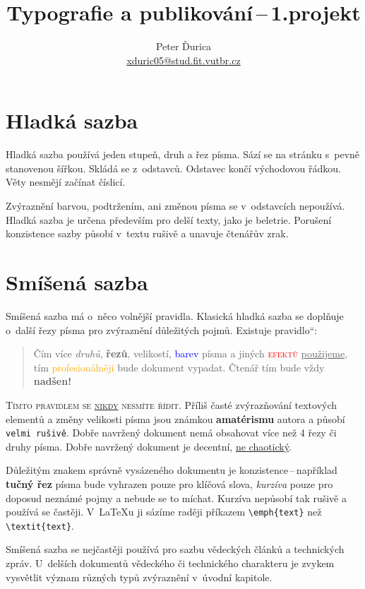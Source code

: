 \documentclass[10pt, a4paper, twocolumn]{article}
\title{Typografie a publikování\,--\,1.projekt}
\author{Peter Ďurica\\\href{mailto:xduric05@stud.fit.vutbr.cz}{xduric05@stud.fit.vutbr.cz}}
\date{\vspace{-5ex}}
\newcommand{\myuv}[1]{\quotedblbase #1\textquotedblleft}
\begin{document}
    \maketitle
    \section{Hladká sazba}

        Hladká sazba používá jeden stupeň, druh a řez písma. Sází se na stránku s~pevně stanovenou šířkou. Skládá se z~od\-stav\-ců. Odstavec končí východovou řádkou. Věty nesmějí začínat číslicí.

        Zvýraznění barvou, podtržením, ani změnou písma se v~odstavcích nepoužívá. Hladká sazba je určena především pro delší texty, jako je beletrie. Porušení konzistence sazby působí v~textu rušivě a unavuje čtenářův zrak.
    \section{Smíšená sazba}
    \label{two}
        Smíšená sazba má o~něco volnější pravidla. Klasická hladká sazba se doplňuje o~další řezy písma pro zvýraznění důle\-žitých pojmů. Existuje \myuv{pravidlo}:
            \begin{quotation}{
                Čím více \emph{druhů}, \textbf{řezů}, \huge velikostí\normalsize,  \textcolor{blue}{barev} písma a jiných \textsc{\textcolor{red}{efektů}} \underline{použijeme}, tím \textcolor{Orange}{pro\-fe\-sio\-nál\-ně\-ji} bude {\selectfont \Large dokument} vypadat. \tiny Čtenář \normalsize tím bude vždy \Huge\textbf{nadšen!}
            }\end{quotation}
        \textsc{Tímto pravidlem se \underline{nikdy} nesmíte řídit.}
        Příliš časté zvýrazňování textových elementů a změny \tiny velikosti \normalsize písma jsou známkou \textbf{amatérismu} autora a působí \texttt{velmi rušivě}.
        Dobře navržený dokument nemá obsahovat více než 4 řezy či druhy písma.
        Dobře navržený dokument je decentní, \underline{ne chaotický}.

        Důležitým znakem správně vysázeného dokumentu je konzistence\,--\,například \textbf{tučný řez} písma bude vyhrazen pouze pro klíčová slova, \emph{kurzíva} pouze pro doposud neznámé pojmy a nebude se to míchat. Kurzíva nepůsobí tak rušivě a používá se častěji. V~\LaTeX u ji sázíme raději příkazem \verb|\emph{text}| než \verb|\textit{text}|.

        Smíšená sazba se nejčastěji používá pro sazbu vědeckých článků a technických zpráv.
     U~delších dokumentů vědeckého či technického charakteru je zvykem vysvětlit význam různých typů zvýraznění v~úvodní kapitole.
\end{document}
